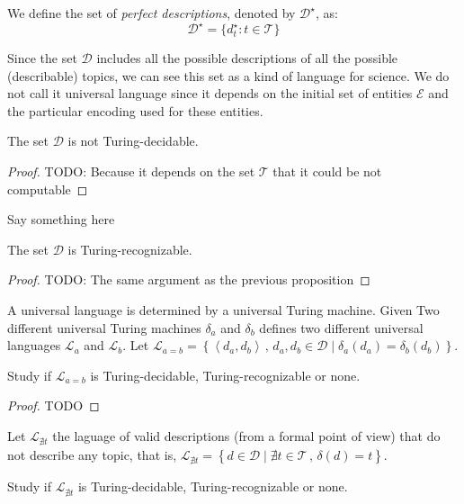 \begin{definition}
We define the set of \emph{perfect descriptions}, denoted by $\mathcal{D}^\star$, as:
\[
\mathcal{D}^\star = \{ d_t^\star : t \in \mathcal{T} \}
\]
\end{definition}

Since the set $\mathcal{D}$ includes all the possible descriptions of all the possible (describable) topics, we can see this set as a kind of language for science. We do not call it universal language since it depends on the initial set of entities $\mathcal{E}$ and the particular encoding used for these entities.

\begin{proposition}
The set $\mathcal{D}$ is not Turing-decidable.
\end{proposition}
\begin{proof}
{\color{red} TODO: Because it depends on the set $\mathcal{T}$ that it could be not computable}
\end{proof}

Say something here

\begin{proposition}
The set $\mathcal{D}$ is Turing-recognizable.
\end{proposition}
\begin{proof}
{\color{red} TODO: The same argument as the previous proposition}
\end{proof}

A universal language is determined by a universal Turing machine. Given Two different universal Turing machines $\delta_{a}$ and $\delta_{b}$ defines two different universal languages $\mathcal{L}_{a}$ and $\mathcal{L}_{b}$. Let $\mathcal{L}_{a=b}=\left\{ \left\langle d_{a},d_{b}\right\rangle \,,\,d_{a},d_{b}\in\mathcal{D}\mid\delta_{a}\left(d_{a}\right)=\delta_{b}\left(d_{b}\right)\right\}$.

\begin{proposition}
Study if $\mathcal{L}_{a=b}$ is Turing-decidable, Turing-recognizable or none.
\end{proposition}
\begin{proof}
{\color{red} TODO}
\end{proof}

Let $\mathcal{L}_{\nexists t}$ the laguage of valid descriptions (from a formal point of view) that do not describe any topic, that is, $\mathcal{L}_{\nexists t}=\left\{ d\in\mathcal{D}\mid\nexists t\in\mathcal{T}\,,\,\delta\left(d\right)=t\right\}$.

\begin{proposition}
Study if $\mathcal{L}_{\nexists t}$ is Turing-decidable, Turing-recognizable or none.
\end{proposition}

